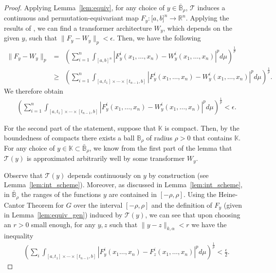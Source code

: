 \documentclass[a4paper,12pt,reqno]{amsart}
\theoremstyle{definition}
\theoremstyle{remark}
\begin{document}
\begin{proof}
        Applying Lemma~\ref{lem:equiv}, for any choice of $y\in \bar{\mathbb B}_\rho$, $\mathcal T$ induces a continuous and permutation-equivariant map $F_y: \mathbb [a,b]^n \longrightarrow \mathbb R^n$. Applying the results of \cite{yun2019transformers}, we can find a transformer architecture $W_y$, which depends on the given $y$, such that $\|F_y - W_y\|_p < \epsilon$. Then, we have the following
        \begin{eqnarray*}
              \|F_y - W_y\|_p
              &=& \left (\sum_{i=1}^n \int_{[a,b]^n}|F^i_y(x_1,\ldots,x_n)-W_y^i(x_1,\ldots,x_n)|^pd\mu \right )^\frac{1}{p}\\
              &\geq& \left (\sum_{i=1}^n \int_{[a,t_1]\times \cdots \times [t_{n-1},b]}|F^i_y(x_1,\ldots,x_n)-W^i_y(x_1,\ldots,x_n)|^pd\mu\right )^\frac{1}{p}.
        \end{eqnarray*}  
        We therefore obtain
        \begin{eqnarray*}
            \left (\sum_{i=1}^n \int_{[a,t_1]\times \cdots \times [t_{n-1},b]}|F^i_y(x_1,\ldots,x_n)-W^i_y(x_1,\ldots,x_n)|^pd\mu\right )^\frac{1}{p} < \epsilon.
        \end{eqnarray*}

    For the second part of the statement, suppose that $\mathbb K$ is compact. Then, by the boundedness of compacts there exists a ball $\mathbb B_\rho$ of radius $\rho>0$ that contains $\mathbb K$. For any choice of $y \in \mathbb K\subset \bar{\mathbb B}_\rho$, we know from the first part of the lemma that $\mathcal T(y)$ is approximated arbitrarily well by some transformer $W_y$. 

    Observe that $\mathcal T(y)$ depends continuously on $y$ by construction (see Lemma~\ref{lem:int_scheme}). Moreover, as discussed in  Lemma~\ref{lem:int_scheme}, in $\bar{\mathbb B}_\rho$ the ranges of the functions $y$ are contained in $[-\rho,\rho]$. Using the Heine-Cantor Theorem for $G$ over the interval $[-\rho,\rho]$ and the definition of $F_y$ (given in Lemma~\ref{lem:equiv_gen}) induced by $\mathcal T(y)$, we can see that upon choosing an $r>0$ small enough, for any $y,z$ such that $\|y-z\|_{k,\alpha} < r$ we have the inequality
    \begin{eqnarray}\label{ineq:local_p}
         \left (\sum_i\int_{[a,t_1]\times \cdots \times [t_{n-1},b]} |F^i_y(x_1\ldots, x_n) - F^i_z(x_1,\ldots, x_n)|^pd\mu\right )^{\frac{1}{p}} < \frac{\epsilon}{2}.
    \end{eqnarray}
    

\end{proof}
\end{document}
